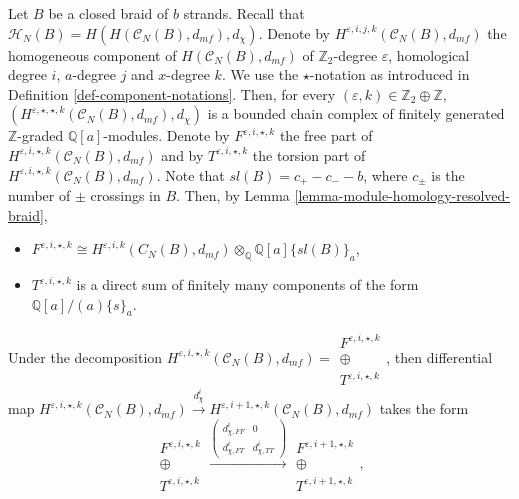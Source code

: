 \documentclass{amsart}
\theoremstyle{plain}
\theoremstyle{definition}
\theoremstyle{remark}
\numberwithin{equation}{section}
\begin{document}
Let $B$ be a closed braid of $b$ strands. Recall that ${\mathcal{H}}_N(B) = H(H({\mathcal{C}}_N(B),d_{mf}),d_\chi)$. Denote by $H^{{\varepsilon},i,j,k}({\mathcal{C}}_N(B),d_{mf})$ the homogeneous component of $H({\mathcal{C}}_N(B),d_{mf})$ of ${\mathbb{Z}}_2$-degree ${\varepsilon}$, homological degree $i$, $a$-degree $j$ and $x$-degree $k$. We use the $\star$-notation as introduced in Definition \ref{def-component-notations}. Then, for every $({\varepsilon},k) \in {\mathbb{Z}}_2\oplus {\mathbb{Z}}$, $(H^{{\varepsilon},\star,\star,k}({\mathcal{C}}_N(B),d_{mf}), d_\chi)$ is a bounded chain complex of finitely generated ${\mathbb{Z}}$-graded ${\mathbb{Q}}[a]$-modules. Denote by $F^{{\varepsilon},i,\star,k}$ the free part of $H^{{\varepsilon},i,\star,k}({\mathcal{C}}_N(B),d_{mf})$ and by $T^{{\varepsilon},i,\star,k}$ the torsion part of $H^{{\varepsilon},i,\star,k}({\mathcal{C}}_N(B),d_{mf})$. Note that $sl(B)=c_+-c_--b$, where $c_\pm$ is the number of $\pm$ crossings in $B$. Then, by Lemma \ref{lemma-module-homology-resolved-braid}, 
\begin{itemize}
	\item $F^{{\varepsilon},i,\star,k} \cong H^{{\varepsilon},i,k}(C_N(B),d_{mf})\otimes_{\mathbb{Q}} {\mathbb{Q}}[a]\{sl(B)\}_a$,
	\item $T^{{\varepsilon},i,\star,k}$ is a direct sum of finitely many components of the form ${\mathbb{Q}}[a]/(a)\{s\}_a$.
\end{itemize}
Under the decomposition $H^{{\varepsilon},i,\star,k}({\mathcal{C}}_N(B),d_{mf}) =  \left.\begin{array}{c}
  F^{{\varepsilon},i,\star,k} \\
  \oplus \\
  T^{{\varepsilon},i,\star,k}
\end{array}\right.$, then differential map $H^{{\varepsilon},i,\star,k}({\mathcal{C}}_N(B),d_{mf}) \xrightarrow{d_\chi^i} H^{{\varepsilon},i+1,\star,k}({\mathcal{C}}_N(B),d_{mf})$ takes the form
\[
\left.\begin{array}{c}
  F^{{\varepsilon},i,\star,k} \\
  \oplus \\
  T^{{\varepsilon},i,\star,k}
\end{array}\right.
\xrightarrow{\left(\begin{array}{cc}
 d_{\chi,FF}^i & 0 \\
 d_{\chi,FT}^i & d_{\chi,TT}^i
\end{array}\right)}
\left.\begin{array}{c}
  F^{{\varepsilon},i+1,\star,k} \\
  \oplus \\
  T^{{\varepsilon},i+1,\star,k}
\end{array}\right.,
\]
\end{document}
